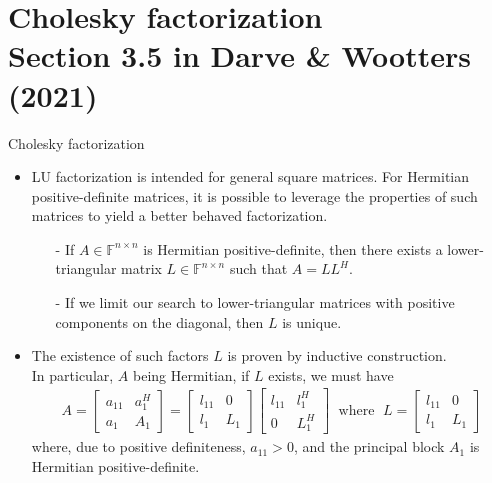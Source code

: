 \documentclass[t,usepdftitle=false]{beamer}
\begin{document}
\section{Cholesky factorization\\{\small Section 3.5 in Darve \& Wootters (2021)}}

\begin{frame}{Cholesky factorization}
\begin{itemize}
\item LU factorization is intended for general square matrices. 
For Hermitian positive-definite matrices, it is possible to leverage the properties of such matrices to yield a better behaved factorization.
\begin{theorem}
\begin{itemize}
\item[-] If $A\in\mathbb{F}^{n\times n}$ is Hermitian positive-definite, then there exists a lower-triangular matrix $L\in\mathbb{F}^{n\times n}$ such that $A=LL^H$.
\item[-] If we limit our search to lower-triangular matrices with positive components on the diagonal, then $L$ is unique.
\end{itemize}
\end{theorem}
\item The existence of such factors $L$ is proven by inductive construction.\\
In particular, $A$ being Hermitian, if $L$ exists, we must have
\begin{align*}
A=
\begin{bmatrix}
a_{11}&a_1^H\\
a_1&A_1
\end{bmatrix}
=
\begin{bmatrix}
l_{11}&0\\
l_1&L_1
\end{bmatrix}
\begin{bmatrix}
l_{11}&l_1^H\\
0&L_1^H
\end{bmatrix}
\;\text{ where }\;
L=
\begin{bmatrix}
l_{11}&0\\
l_1&L_1
\end{bmatrix}
\end{align*}
where, due to positive definiteness, $a_{11}>0$, and the principal block $A_1$ is Hermitian positive-definite.
\end{itemize}
\end{frame}
\end{document}
